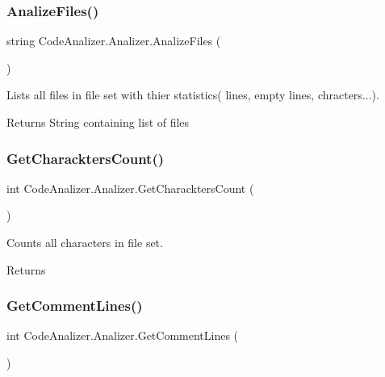 \subsubsection{\texorpdfstring{Analize\+Files()}{AnalizeFiles()}}
{\footnotesize\ttfamily string Code\+Analizer.\+Analizer.\+Analize\+Files (\begin{DoxyParamCaption}{ }\end{DoxyParamCaption})}



Lists all files in file set with thier statistics( lines, empty lines, chracters...). 

\begin{DoxyReturn}{Returns}
String containing list of files
\end{DoxyReturn}
\mbox{\label{class_code_analizer_1_1_analizer_a97730ca4bd3b1dbe6257779279f0f7f4}} 
\subsubsection{\texorpdfstring{Get\+Charackters\+Count()}{GetCharacktersCount()}}
{\footnotesize\ttfamily int Code\+Analizer.\+Analizer.\+Get\+Charackters\+Count (\begin{DoxyParamCaption}{ }\end{DoxyParamCaption})}



Counts all characters in file set. 

\begin{DoxyReturn}{Returns}

\end{DoxyReturn}
\mbox{\label{class_code_analizer_1_1_analizer_aa1c5078ca9d05746785e071c8c9200f6}} 
\subsubsection{\texorpdfstring{Get\+Comment\+Lines()}{GetCommentLines()}}
{\footnotesize\ttfamily int Code\+Analizer.\+Analizer.\+Get\+Comment\+Lines (\begin{DoxyParamCaption}{ }\end{DoxyParamCaption})}



